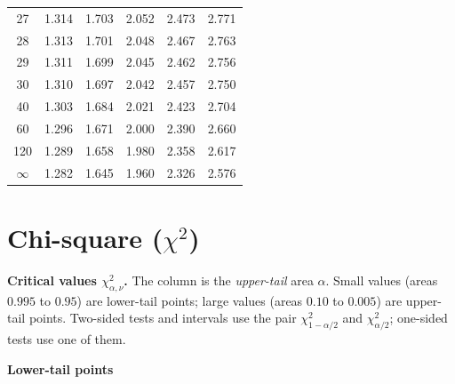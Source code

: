 \begin{center}
\begin{tabular}{c|ccccc}
27 & 1.314 & 1.703 & 2.052 & 2.473 & 2.771 \\
28 & 1.313 & 1.701 & 2.048 & 2.467 & 2.763 \\
29 & 1.311 & 1.699 & 2.045 & 2.462 & 2.756 \\
30 & 1.310 & 1.697 & 2.042 & 2.457 & 2.750 \\
40 & 1.303 & 1.684 & 2.021 & 2.423 & 2.704 \\
60 & 1.296 & 1.671 & 2.000 & 2.390 & 2.660 \\
120 & 1.289 & 1.658 & 1.980 & 2.358 & 2.617 \\
$\infty$ & 1.282 & 1.645 & 1.960 & 2.326 & 2.576 \\
\bottomrule
\end{tabular}
\end{center}

\section{Chi-square ($\chi^2$)}

\textbf{Critical values $\chi^2_{\alpha,\nu}$.} The column is the \emph{upper-tail} area $\alpha$. Small values (areas $0.995$ to $0.95$) are lower-tail points; large values (areas $0.10$ to $0.005$) are upper-tail points. Two-sided tests and intervals use the pair $\chi^2_{1-\alpha/2}$ and $\chi^2_{\alpha/2}$; one-sided tests use one of them.

\textbf{Lower-tail points}

